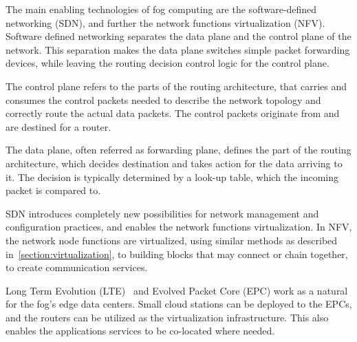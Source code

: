 The main enabling technologies of fog computing are the software-defined networking (SDN), and further the network functions virtualization (NFV). Software defined networking separates the data plane and the control plane of the network. This separation makes the data plane switches simple packet forwarding devices, while leaving the routing decision control logic for the control plane.~\cite{Kim:2013:SDN, Demestichas:2013:NFV}

The control plane refers to the parts of the routing architecture, that carries and consumes the control packets needed to describe the network topology and correctly route the actual data packets. The control packets originate from and are destined for a router.~\cite{Chao:2007:HPS:1202844, Yang:2004:FCE:RFC3746}

The data plane, often referred as forwarding plane, defines the part of the routing architecture, which decides destination and takes action for the data arriving to it. The decision is typically determined by a look-up table, which the incoming packet is compared to.~\cite{Chao:2007:HPS:1202844, Yang:2004:FCE:RFC3746}

SDN introduces completely new possibilities for network management and configuration practices, and enables the network functions virtualization. In NFV, the network node functions are virtualized, using similar methods as described in~\ref{section:virtualization}, to building blocks that may connect or chain together, to create communication services.~\cite{Demestichas:2013:NFV}

Long Term Evolution (LTE)~\cite{Sesia:2009:LTE} and Evolved Packet Core (EPC) work as a natural for the fog's edge data centers. Small cloud stations can be deployed to the EPCs, and the routers can be utilized as the virtualization infrastructure. This also enables the applications services to be co-located where needed.~\cite{vaquero:2014:FYW}




